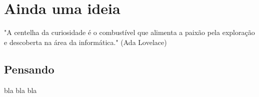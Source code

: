 \chapter{Ainda uma ideia}

\begin{remark}
"A centelha da curiosidade é o combustível que alimenta a paixão pela exploração e descoberta na área da informática." (Ada Lovelace) 
\end{remark}

\section{Pensando}
bla bla bla

\clearpage